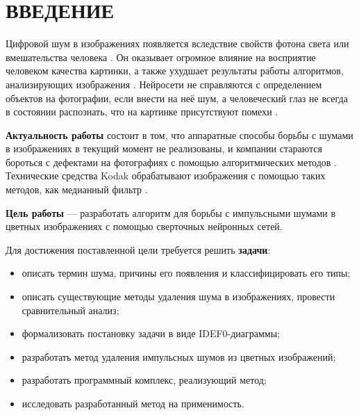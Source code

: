 \section*{ВВЕДЕНИЕ}
Цифровой шум в изображениях появляется вследствие свойств фотона света или вмешательства человека \cite{shum}.
Он оказывает огромное влияние на восприятие человеком качества картинки, а также ухудшает результаты работы алгоритмов, анализирующих изображения \cite{software}. 
Нейросети не справляются с определением объектов на фотографии, если внести на неё шум, а человеческий глаз не всегда в состоянии распознать, что на картинке присутствуют помехи \cite{nn1s}.

\textbf{Актуальность работы} состоит в том, что аппаратные способы борьбы с шумами в изображениях в текущий момент не реализованы, и компании стараются бороться с дефектами на фотографиях с помощью алгоритмических методов \cite{software}. 
Технические средства Kodak обрабатывают изображения с помощью таких методов, как медианный фильтр \cite{kodak}.

\textbf{Цель работы} --- разработать алгоритм для борьбы с импульсными шумами в цветных изображениях с помощью сверточных нейронных сетей.

Для достижения поставленной цели требуется решить \textbf{задачи}:
\begin{itemize}
	\item описать термин шума, причины его появления и классифицировать его типы;
	\item описать существующие методы удаления шума в изображениях, провести сравнительный анализ;
	\item формализовать постановку задачи в виде IDEF0-диаграммы;
	\item разработать метод удаления импульсных шумов из цветных изображений;
	\item разработать программный комплекс, реализующий метод;
	\item исследовать разработанный метод на применимость.
\end{itemize}